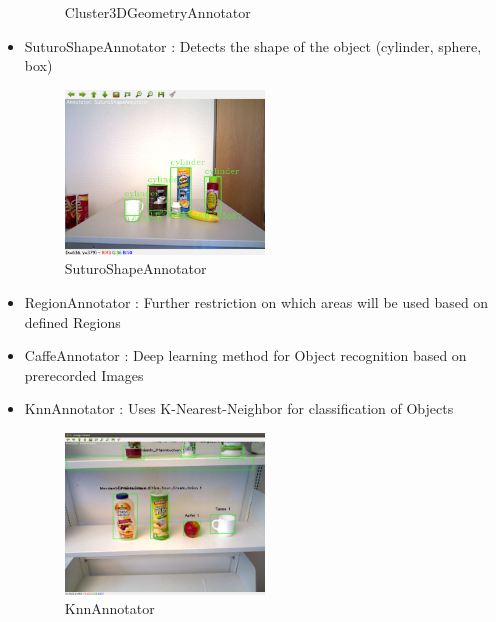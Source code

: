 \documentclass[main.tex]{subfiles}
\begin{document}
\begin{itemize}
\begin{figure}[H]
   			 \caption{Cluster3DGeometryAnnotator}
  		\end{figure}
	\item SuturoShapeAnnotator : Detects the shape of the object (cylinder, sphere, box)
		\begin{figure}[H]
   			 \centering
    			 \includegraphics[width=0.5\textwidth]{pictures/2d/SuturoShapeAnnotator.png}
   			 \caption{SuturoShapeAnnotator}
  		\end{figure}
	\item RegionAnnotator : Further restriction on which areas will be used based on defined Regions 
	\item CaffeAnnotator : Deep learning method for Object recognition based on prerecorded Images 
	\item KnnAnnotator : Uses K-Nearest-Neighbor for classification of Objects 
		\begin{figure}[H]
   			 \centering
    			 \includegraphics[width=0.5\textwidth]{pictures/2d/KnnAnnotator.png}
   			 \caption{KnnAnnotator}
  		\end{figure}
\end{itemize}
\end{document}
